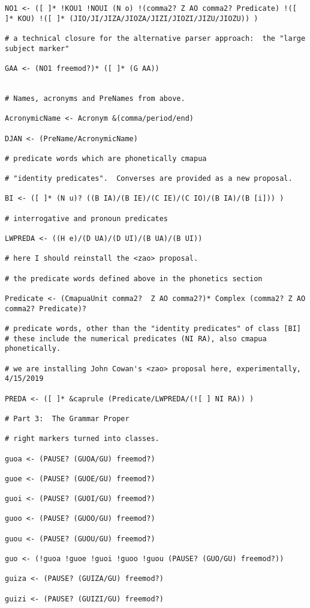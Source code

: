 \documentclass[12pt]{book}
\begin{document}
{\begin{verbatim}
NO1 <- ([ ]* !KOU1 !NOUI (N o) !(comma2? Z AO comma2? Predicate) !([ ]* KOU) !([ ]* (JIO/JI/JIZA/JIOZA/JIZI/JIOZI/JIZU/JIOZU)) )

# a technical closure for the alternative parser approach:  the "large subject marker"

GAA <- (NO1 freemod?)* ([ ]* (G AA))


# Names, acronyms and PreNames from above.

AcronymicName <- Acronym &(comma/period/end)

DJAN <- (PreName/AcronymicName)

# predicate words which are phonetically cmapua

# "identity predicates".  Converses are provided as a new proposal.

BI <- ([ ]* (N u)? ((B IA)/(B IE)/(C IE)/(C IO)/(B IA)/(B [i])) )

# interrogative and pronoun predicates

LWPREDA <- ((H e)/(D UA)/(D UI)/(B UA)/(B UI))

# here I should reinstall the <zao> proposal.

# the predicate words defined above in the phonetics section

Predicate <- (CmapuaUnit comma2?  Z AO comma2?)* Complex (comma2? Z AO comma2? Predicate)?

# predicate words, other than the "identity predicates" of class [BI]
# these include the numerical predicates (NI RA), also cmapua phonetically.

# we are installing John Cowan's <zao> proposal here, experimentally, 4/15/2019

PREDA <- ([ ]* &caprule (Predicate/LWPREDA/(![ ] NI RA)) )

# Part 3:  The Grammar Proper

# right markers turned into classes.

guoa <- (PAUSE? (GUOA/GU) freemod?)

guoe <- (PAUSE? (GUOE/GU) freemod?)

guoi <- (PAUSE? (GUOI/GU) freemod?)

guoo <- (PAUSE? (GUOO/GU) freemod?)

guou <- (PAUSE? (GUOU/GU) freemod?)

guo <- (!guoa !guoe !guoi !guoo !guou (PAUSE? (GUO/GU) freemod?))

guiza <- (PAUSE? (GUIZA/GU) freemod?)

guizi <- (PAUSE? (GUIZI/GU) freemod?)


\end{verbatim}}
\end{document}
